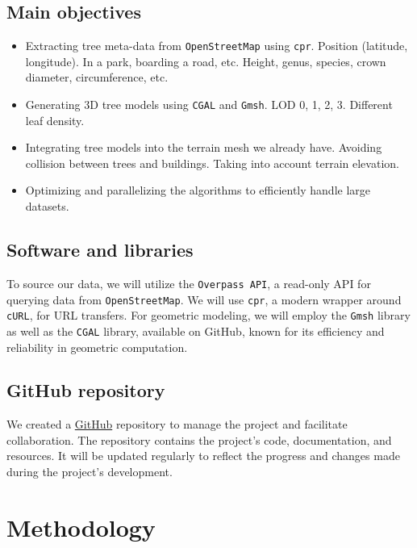\documentclass[12pt]{article}
\begin{document}
\subsection{Main objectives}

\begin{itemize}
    \item Extracting tree meta-data from \texttt{OpenStreetMap} using \texttt{cpr}\cite{cpr}.
    \subitem Position (latitude, longitude). In a park, boarding a road, etc.
    \subitem Height, genus, species, crown diameter, circumference, etc.
    \item Generating 3D tree models using \texttt{CGAL}\cite{cgal} and \texttt{Gmsh}\cite{gmsh}.
    \subitem LOD 0, 1, 2, 3.
    \subitem Different leaf density.
    \item Integrating tree models into the terrain mesh we already have.
    \subitem Avoiding collision between trees and buildings.
    \subitem Taking into account terrain elevation.
    \item Optimizing and parallelizing the algorithms to efficiently handle large datasets.
\end{itemize}

\subsection{Software and libraries}
To source our data, we will utilize the \texttt{Overpass API}\cite{overpass}, 
a read-only API for querying data from \texttt{OpenStreetMap}. We will use 
\texttt{cpr}\cite{cpr}, a modern wrapper around \texttt{cURL}\cite{curl}, for 
URL transfers. For geometric modeling, we will employ the \texttt{Gmsh}\cite{gmsh} 
library as well as the \texttt{CGAL} library, available on 
GitHub\cite{cgal-master}, known for its efficiency and reliability in geometric 
computation.


\subsection{GitHub repository}
We created a \href{https://github.com/feelpp/ktirio-geom}{GitHub}
repository to manage the project and facilitate collaboration.
The repository contains the project's code, documentation, and resources.
It will be updated regularly to reflect the progress and changes made during
the project's development.


\section{Methodology}
\end{document}

